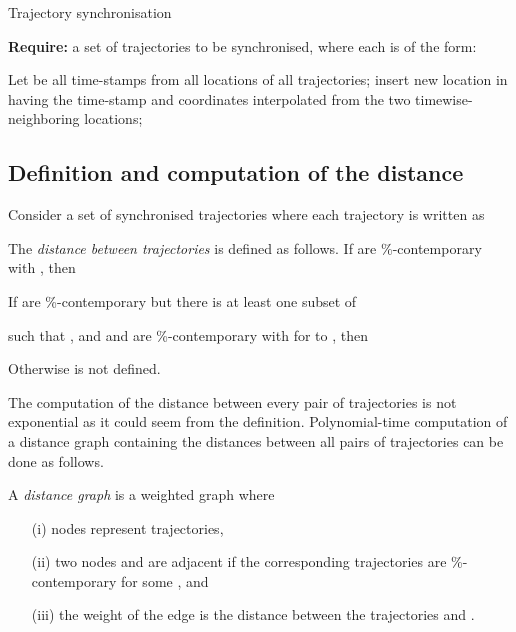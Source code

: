 \begin{algorithm}[!ht]
\caption{Trajectory synchronisation} \label{alg:sync}
\begin{algorithmic}[1]
\STATE \textbf{Require:}  a set of trajectories to be
synchronised, where each  is of the form:

\STATE Let  be all time-stamps from all locations of all trajectories;
\FORALL{}
      \STATE insert new location in  having the time-stamp  and
      coordinates interpolated from the two timewise-neighboring locations;
    \ENDIF
  \ENDFOR
\ENDFOR
\end{algorithmic}
\end{algorithm}

\subsection{Definition and computation of the distance}
\label{comput}

\begin{definition} \label{def:distance}
Consider a set of synchronised trajectories  where each trajectory is written as

The \emph{distance between trajectories} is defined as follows.
If  are \%-contemporary with , then

If  are \%-contemporary but there is
at least one subset of 

such that , 
and  and  are \%-contemporary
with  for  to , then

Otherwise  is not defined.
\end{definition}

The computation of the distance between every pair of trajectories is not
exponential as it could seem from the definition. Polynomial-time
computation of a distance graph containing the distances between all pairs
of trajectories can be done as follows.

\begin{definition} \label{def:distancegraph}
A \emph{distance graph} is a weighted graph where
\begin{enumerate}
\setlength{\itemsep}{-1mm}
\item[(i)] nodes represent trajectories,
\item[(ii)] two nodes  and  are adjacent if the corresponding
trajectories are \%-contemporary for some
, and
\item[(iii)] the weight of the edge  is the distance between
the trajectories  and .
\end{enumerate}
\end{definition}

